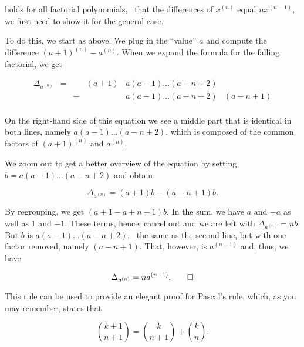 \documentclass[tikz]{scrreprt}
\begin{document}
holds for all factorial polynomials,
\ie\ that the differences of $x^{(n)}$
equal $nx^{(n-1)}$,
we first need to show it for the general case.

To do this, we start as above. We plug in
the ``value'' $a$ and compute the difference
$(a+1)^{(n)} - a^{(n)}$. When we expand the
formula for the falling factorial, we get

\[
\begin{array}{lcclll}
\Delta_{a^{(n)}} & = &   & (a+1) & a(a-1)\dots(a-n+2) & \\
                 &   & - &       & a(a-1)\dots(a-n+2) & (a-n+1)\\
\end{array}
\]


On the right-hand side of this equation
we see a middle part that is identical
in both lines, namely $a(a-1)\dots(a-n+2)$,
which is composed of the common factors of
$(a+1)^{(n)}$ and $a^{(n)}$.

We zoom out to get a better overview of the equation
by setting $b=a(a-1)\dots(a-n+2)$ and obtain:

\begin{equation}
  \Delta_{a^{(n)}} = (a+1)b - (a-n+1)b.
\end{equation}

By regrouping, we get $(a+1-a+n-1)b$.
In the sum, we have $a$ and $-a$ as well as 1 and $-1$.
These terms, hence, cancel out and we are left with
$\Delta_{a^{(n)}} = nb$.
But $b$ is $a(a-1)\dots(a-n+2)$, \ie\ the same
as the second line, but with one factor removed, namely
$(a-n+1)$. That, however, is $a^{(n-1)}$ and, thus,
we have

\begin{equation}
  \Delta_{a^{(n)}} = na^{(n-1)}.\qed
\end{equation}

This rule can be used to provide an elegant proof
for Pascal's rule, which, as you may remember,
states that

\begin{equation}
\binom{k+1}{n+1} = \binom{k}{n+1} + \binom{k}{n}.
\end{equation}
\end{document}
